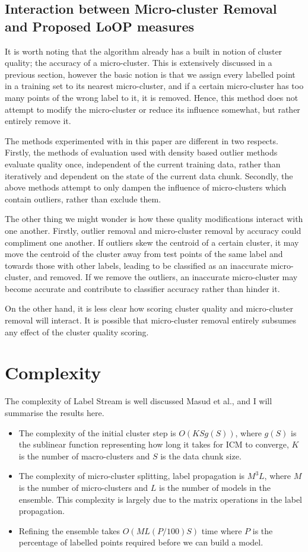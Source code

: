 \documentclass[12pt,a4paper,oneside]{report}
\begin{document}
\subsection*{Interaction between Micro-cluster Removal and Proposed LoOP measures}

It is worth noting that the algorithm already has a built in notion of cluster quality; the accuracy of a micro-cluster. This is extensively discussed in a previous section, however the basic notion is that we assign every labelled point in a training set to its nearest micro-cluster, and if a certain micro-cluster has too many points of the wrong label to it, it is removed. Hence, this method does not attempt to modify the micro-cluster or reduce its influence somewhat, but rather entirely remove it. 

The methods experimented with in this paper are different in two respects. Firstly, the methods of evaluation used with density based outlier methods evaluate quality once, independent of the current training data, rather than iteratively and dependent on the state of the current data chunk. Secondly, the above methods attempt to only dampen the influence of micro-clusters which contain outliers, rather than exclude them. 

The other thing we might wonder is how these quality modifications interact with one another. Firstly, outlier removal and micro-cluster removal by accuracy could compliment one another. If outliers skew the centroid of a certain cluster, it may move the centroid of the cluster away from test points of the same label and towards those with other labels, leading to be classified as an inaccurate micro-cluster, and removed. If we remove the outliers, an inaccurate micro-cluster may become accurate and contribute to classifier accuracy rather than hinder it. 

On the other hand, it is less clear how scoring cluster quality and micro-cluster removal will interact. It is possible that micro-cluster removal entirely subsumes any effect of the cluster quality scoring. 


\section*{Complexity}

The complexity of Label Stream is well discussed Masud et al.\cite{TechRep}, and I will summarise the results here. 
\begin{itemize}
\item The complexity of the initial cluster step is $O(KS g(S))$, where $g(S)$ is the sublinear function representing how long it takes for ICM to converge, $K$ is the number of macro-clusters and $S$ is the data chunk size.
\item The complexity of micro-cluster splitting, label propagation is $M^3L$, where $M$ is the number of micro-clusters and $L$ is the number of models in the ensemble. This complexity is largely due to the matrix operations in the label propagation.
\item Refining the ensemble takes $O(ML(P/100)S)$ time where $P$ is the percentage of labelled points required before we can build a model. 
\end{itemize} 
\end{document}
